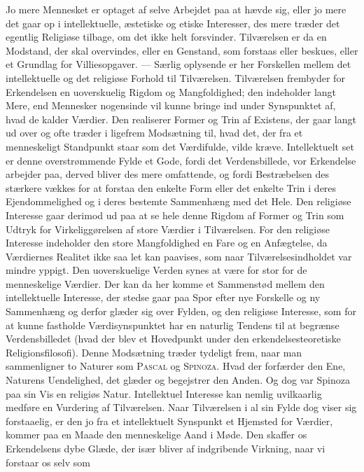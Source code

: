 \documentclass[12pt,a4paper,openany]{book}
\newcommand{\opage}[1]{\marginnote{\footnotesize\textit{[#1]}}}
\begin{document}
Jo mere Mennesket er optaget af selve Arbejdet paa at hævde sig, eller
jo mere det gaar op i intellektuelle, æstetiske og etiske Interesser,
des mere træder det egentlig Religiøse tilbage, om det ikke helt
forsvinder. Tilværelsen er da en Modstand, der skal overvindes, eller en
Genstand, som forstaas eller beskues, eller et Grundlag for
Villiesopgaver. --- Særlig oplysende er her Forskellen mellem det
intellektuelle og det religiøse Forhold til Tilværelsen. Tilværelsen
frembyder for Erkendelsen en uoverskuelig Rigdom og Mangfoldighed; den
indeholder langt Mere, end Mennesker nogensinde vil kunne bringe ind
under Synspunktet af, hvad de kalder Værdier. Den realiserer Former og
Trin af Existens, der gaar langt ud over og ofte træder i ligefrem
Modsætning til, hvad det, der fra et menneskeligt Standpunkt staar som
det Værdifulde, vilde kræve. Intellektuelt set er denne overstrømmende
Fylde et Gode, fordi det Verdensbillede, vor Erkendelse arbejder paa,
derved bliver des mere omfattende, og fordi Bestræbelsen des stærkere
vækkes for at forstaa den enkelte Form eller det enkelte Trin i deres
Ejendommelighed og i deres bestemte Sammenhæng med det Hele. Den
religiøse Interesse gaar derimod ud paa at se hele denne Rigdom af
Former og Trin som Udtryk for Virkeliggørelsen af store Værdier i
Tilværelsen. For den religiøse Interesse indeholder den store
Mangfoldighed en Fare og en Anfægtelse, da Værdiernes Realitet ikke saa
let kan paavises, som naar Tilværelsesindholdet var mindre yppigt. Den
uoverskuelige Verden synes at være for stor for de menneskelige Værdier.
Der kan da her komme et Sammenstød mellem den intellektuelle Interesse,
der stedse gaar paa Spor efter nye Forskelle og ny Sammenhæng og derfor
glæder sig over Fylden, og den religiøse Interesse, som for at kunne
fastholde Værdisynspunktet har en naturlig Tendens til at begrænse
Verdensbilledet (hvad der blev et Hovedpunkt under den
erkendelsesteoretiske Religionsfilosofi). Denne Modsætning træder
tydeligt frem, naar man sammenligner to Naturer som \textsc{Pascal} og
\textsc{Spinoza}. Hvad der forfærder den Ene, Naturens Uendelighed, det
glæder og begejstrer den Anden. Og dog var Spinoza paa sin Vis en
religiøs Natur. Intellektuel Interesse kan nemlig
\opage{67}uvilkaarlig medføre en Vurdering af Tilværelsen. Naar
Tilværelsen i al sin Fylde dog viser sig forstaaelig, er den jo fra et
intellektuelt Synspunkt et Hjemsted for Værdier, kommer paa en Maade den
menneskelige Aand i Møde. Den skaffer os Erkendelsens dybe Glæde, der
især bliver af indgribende Virkning, naar vi forstaar os selv som
\end{document}
